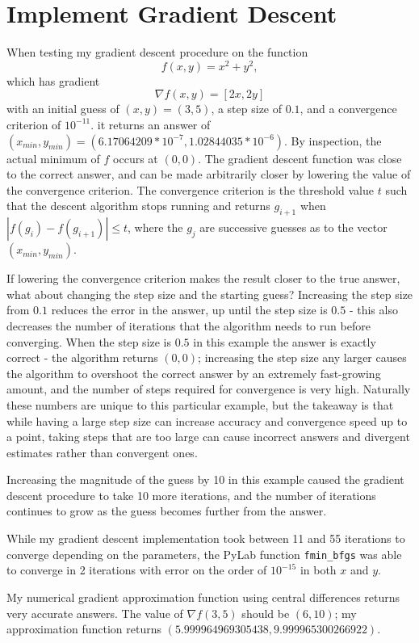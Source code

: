 \documentclass{paper}
\begin{document}
\section{Implement Gradient Descent}

When testing my gradient descent procedure on the function
\[
f(x, y) = x^2 + y^2,
\]
which has gradient
\[
\nabla f(x, y) = [2x, 2y]
\]
with an initial guess of $(x, y) = (3, 5)$, a step size of $0.1$, and a convergence criterion of $10^{-11}$. it returns an answer of $(x_{min}, y_{min}) = (6.17064209 * 10^{-7},   1.02844035 * 10^{-6})$. By inspection, the actual minimum of $f$ occurs at $(0, 0)$. The gradient descent function was close to the correct answer, and can be made arbitrarily closer by lowering the value of the convergence criterion. The convergence criterion is the threshold value $t$ such that the descent algorithm stops running and returns $g_{i+1}$ when $|f(g_i) - f(g_{i+1})| \le t$, where the $g_j$ are successive guesses as to the vector $(x_{min}, y_{min})$.

If lowering the convergence criterion makes the result closer to the true answer, what about changing the step size and the starting guess? Increasing the step size from $0.1$ reduces the error in the answer, up until the step size is $0.5$ - this also decreases the number of iterations that the algorithm needs to run before converging. When the step size is $0.5$ in this example the answer is exactly correct - the algorithm returns $(0, 0)$; increasing the step size any larger causes the algorithm to overshoot the correct answer by an extremely fast-growing amount, and the number of steps required for convergence is very high. Naturally these numbers are unique to this particular example, but the takeaway is that while having a large step size can increase accuracy and convergence speed up to a point, taking steps that are too large can cause incorrect answers and divergent estimates rather than convergent ones.

Increasing the magnitude of the guess by 10 in this example caused the gradient descent procedure to take 10 more iterations, and the number of iterations continues to grow as the guess becomes further from the answer.

While my gradient descent implementation took between 11 and 55 iterations to converge depending on the parameters, the PyLab function \texttt{fmin\_bfgs} was able to converge in 2 iterations with error on the order of $10^{-15}$ in both $x$ and $y$.

My numerical gradient approximation function using central differences returns very accurate answers. The value of $\nabla f(3, 5)$ should be $(6, 10)$; my approximation function returns $(5.999964969305438, 9.999965300266922)$.
\end{document}
